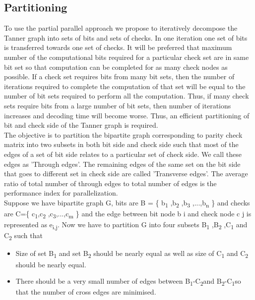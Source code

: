 \documentclass[twopage,12pt,a4paper]{report}
\begin{document}
\begin{raggedright}
\section{Partitioning}
To use the partial parallel approach we propose to iteratively decompose the Tanner graph into sets of bits and sets of checks. In one iteration one set of bits is transferred towards one set of checks. It will be preferred that maximum number of the computational bits required for a particular check set are in same bit set so that computation can be completed for as many check nodes as possible. If a check set requires bits from many bit sets, then the number of iterations required to complete the computation of that set will be equal to the number of bit sets required to perform all the computation. Thus, if many check sets require bits from a large number of bit sets, then number of iterations increases and decoding time will become worse. Thus, an efficient partitioning of bit and check side of the Tanner graph is required. \\
The objective is to partition the bipartite graph corresponding to parity check matrix into two subsets in both bit side and check side such that most of the edges of a set of bit side relates to a particular set of check side. We call these edges as ’Through edges’. The remaining edges of the same set on the bit side that goes to different set in check side are called ’Transverse edges’. The average ratio of total number
of through edges to total number of edges is the performance index for parallelization. \\
Suppose we have bipartite graph G, bits are
B = \{ b\textsubscript{1} ,b\textsubscript{2} ,b\textsubscript{3} ,...,b\textsubscript{n} \} and checks are C=\{ c\textsubscript{1},c\textsubscript{2} ,c\textsubscript{3},...,c\textsubscript{m} \}
and the edge between bit node b i and check node c j is represented as e\textsubscript{i,j}. Now we have to partition G into four subsets B\textsubscript{1} ,B\textsubscript{2} ,C\textsubscript{1} and C\textsubscript{2} such that
\begin{itemize}
\item   Size of set B\textsubscript{1} and set B\textsubscript{2} should be nearly equal as well
as size of C\textsubscript{1} and C\textsubscript{2} should be nearly equal.
\item  There should be a very small number of edges between
B\textsubscript{1}-C\textsubscript{2}and B\textsubscript{2}-C\textsubscript{1}so that the number of cross edges are minimised. 
\end{itemize}



\end{raggedright}
\end{document}
